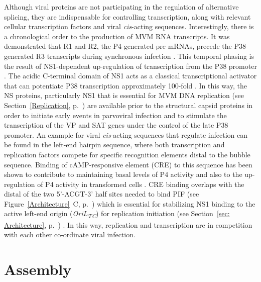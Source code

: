 Although viral proteins are not participating in the regulation of alternative splicing, they are indispensable for controlling transcription, along with relevant cellular transcription factors and viral \textit{cis}-acting sequences. Interestingly, there is a chronological order to the production of MVM RNA transcripts. It was demonstrated that R1 and R2, the P4-generated pre-mRNAs, precede the P38-generated R3 transcripts during synchronous infection \cite{pmid3346950}. This temporal phasing is the result of NS1-dependent up-regulation of transcription from the P38 promoter \cite{pmid3171551, pmid4020972}. The acidic C-terminal domain of NS1 acts as a classical transcriptional activator that can potentiate P38 transcription approximately 100-fold \cite{pmid1388209}. In this way, the NS proteins, particularly NS1 that is essential for MVM DNA replication (see Section~\ref{Replication}, p.~\pageref{Replication}) are available prior to the structural capsid proteins in order to initiate early events in parvoviral infection and to stimulate the transcription of the VP and SAT genes under the control of the late P38 promoter. An example for viral \textit{cis}-acting sequences that regulate infection can be found in the left-end hairpin sequence, where both transcription and replication factors compete for specific recognition elements distal to the bubble sequence. Binding of cAMP-responsive element (CRE) to this sequence has been shown to contribute to maintaining basal levels of P4 activity and also to the up-regulation of P4 activity in transformed cells \cite{pmid7636996, pmid8627649}. CRE binding overlaps with the distal of the two 5'-ACGT-3' half sites needed to bind PIF (see Figure~\ref{Architecture}~C, p.~\pageref{Architecture}) which is essential for stabilizing NS1 binding to the active left-end origin (\textit{OriL\textsubscript{TC}}) for replication initiation (see Section~\ref{sec: Architecture}, p.~\pageref{sec: Architecture}) \cite{pmid12050365}. In this way, replication and transcription are in competition with each other co-ordinate viral infection.            

       





\section{Assembly}
\label{Assembly}

